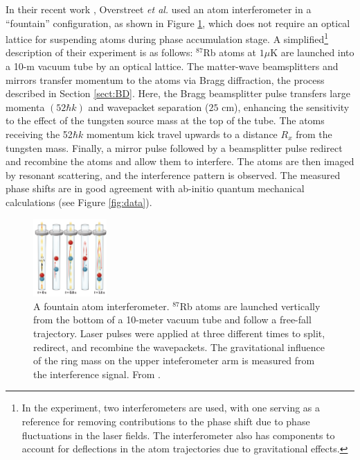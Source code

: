 \documentclass[reprint,
nofootinbib,
amsmath,amssymb,
aps]{revtex4-1}
\begin{document}
In their recent work \cite{overstreet2022observation}, Overstreet \textit{et al.} used an atom interferometer in a ``fountain'' configuration, as shown in Figure \ref{fig:overstreet1}, which does not require an optical lattice for suspending atoms during phase accumulation stage.  A simplified\footnote{In the experiment, two interferometers are used, with one serving as a reference for removing contributions to the phase shift due to phase fluctuations in the laser fields. The interferometer also has components to account for deflections in the atom trajectories due to gravitational effects.} description of their experiment is as follows: $^{87}$Rb atoms at $1 \mu$K are launched into a 10-m vacuum tube by an optical lattice. The matter-wave beamsplitters and mirrors transfer momentum to the atoms via Bragg diffraction, the process described in Section \ref{sect:BD}.  Here, the Bragg beamsplitter pulse transfers large momenta $(52\hbar k)$ and wavepacket separation ($25$ cm), enhancing the sensitivity to the effect of the tungsten source mass at the top of the tube. The atoms receiving the 52$\hbar k$ momentum kick travel upwards to a distance $R_x$ from the tungsten mass. Finally, a mirror pulse followed by a beamsplitter pulse redirect and recombine the atoms and allow them to interfere. The atoms are then imaged by resonant scattering, and the interference pattern is observed. The measured phase shifts are in good agreement with ab-initio quantum mechanical calculations (see Figure \ref{fig:data}). 






\begin{figure}
	\includegraphics[width=0.25\textwidth]{overstreet1.png}
	\caption{A fountain atom interferometer. $^{87}$Rb atoms are launched vertically from the bottom of a 10-meter vacuum tube and follow a free-fall trajectory. Laser pulses were applied at three different times to split, redirect, and recombine the wavepackets. The gravitational influence of the ring mass on the upper inteferometer arm is measured from the interference signal. From \cite{roura2022quantum}.}
	\label{fig:overstreet1}
\end{figure}
\end{document}
